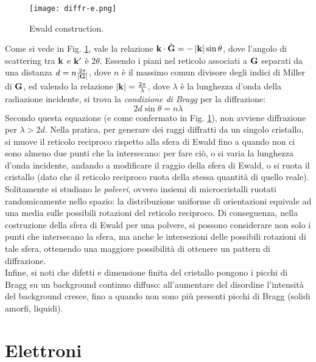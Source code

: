 \begin{figure}
	\centering
	\texttt{[image: diffr-e.png]}
	\caption{Ewald construction.}
	\label{diffr-e}
\end{figure}

Come si vede in Fig. \ref{diffr-e}, vale la relazione $ \mathbf{k} \cdot \hat{\mathbf{G}} = - \left\lvert\mathbf{k}\right\rvert \sin \theta $, dove l'angolo di scattering tra $ \mathbf{k} $ e $ \mathbf{k}' $ è $ 2\theta $. Essendo i piani nel reticolo associati a $ \mathbf{G} $ separati da una distanza $ d = n \frac{2\pi}{\left\lvert\mathbf{G}\right\rvert} $, dove $ n $ è il massimo comun divisore degli indici di Miller di $ \mathbf{G} $, ed valendo la relazione $ \left\lvert\mathbf{k}\right\rvert = \frac{2\pi}{\lambda} $, dove $ \lambda $ è la lunghezza d'onda della radiazione incidente, si trova la \textit{condizione di Bragg} per la diffrazione:
\begin{equation}
	2 d \sin \theta = n \lambda
\end{equation}
Secondo questa equazione (e come confermato in Fig. \ref{diffr-e}), non avviene diffrazione per $ \lambda > 2d $. Nella pratica, per generare dei raggi diffratti da un singolo cristallo, si muove il reticolo reciproco rispetto alla sfera di Ewald fino a quando non ci sono almeno due punti che la intersecano: per fare ciò, o si varia la lunghezza d'onda incidente, andando a modificare il raggio della sfera di Ewald, o si ruota il cristallo (dato che il reticolo reciproco ruota della stessa quantità di quello reale). \\
Solitamente si studiano le \textit{polveri}, ovvero insiemi di microcristalli ruotati randomicamente nello spazio: la distribuzione uniforme di orientazioni equivale ad una media sulle possibili rotazioni del reticolo reciproco. Di conseguenza, nella costruzione della sfera di Ewald per una polvere, si possono considerare non solo i punti che intersecano la sfera, ma anche le intersezioni delle possibili rotazioni di tale sfera, ottenendo una maggiore possibilità di ottenere un pattern di diffrazione. \\
Infine, si noti che difetti e dimensione finita del cristallo pongono i picchi di Bragg su un background continuo diffuso: all'aumentare del disordine l'intensità del background cresce, fino a quando non sono più presenti picchi di Bragg (solidi amorfi, liquidi).

\section{Elettroni}


